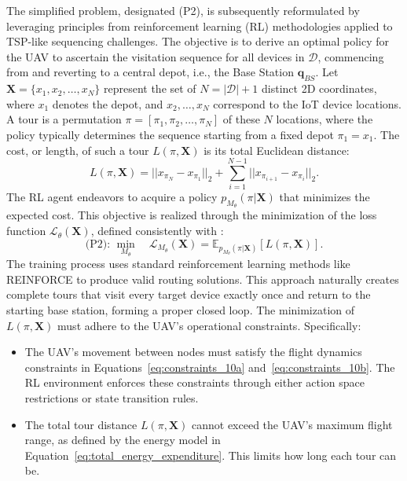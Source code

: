 \documentclass[10pt,conference,letterpaper]{IEEEtran}
\begin{document}
The simplified problem, designated (P2), is subsequently reformulated by leveraging principles from reinforcement learning (RL) methodologies applied to TSP-like sequencing challenges. The objective is to derive an optimal policy for the UAV to ascertain the visitation sequence for all devices in $\mathcal{D}$, commencing from and reverting to a central depot, i.e., the Base Station $\mathbf{q}_{BS}$.
Let $\mathbf{X} = \{x_1, x_2, \dots, x_N\}$ represent the set of $N=|\mathcal{D}|+1$ distinct 2D coordinates, where $x_1$ denotes the depot, and $x_2, \dots, x_N$ correspond to the IoT device locations. A tour is a permutation $\pi = [\pi_1, \pi_2, \dots, \pi_N]$ of these $N$ locations, where the policy typically determines the sequence starting from a fixed depot $\pi_1 = x_1$. The cost, or length, of such a tour $L(\pi, \mathbf{X})$ is its total Euclidean distance:
\begin{equation}
\label{eq:P2_rl_tsp_cost_revised}
L(\pi, \mathbf{X}) = ||x_{\pi_N} - x_{\pi_1}||_2 + \sum_{i=1}^{N-1} ||x_{\pi_{i+1}} - x_{\pi_i}||_2.
\end{equation}
The RL agent endeavors to acquire a policy $p_{M_{\theta}}(\pi|\mathbf{X})$ that minimizes the expected cost. This objective is realized through the minimization of the loss function $\mathcal{L}_{\theta}(\mathbf{X})$, defined consistently with \cite{DBLP:conf/aaai/ZhangZW022}:
\begin{equation}
\label{eq:P2_rl_loss_revised}
\text{(P2): } \min_{M_{\theta}} \quad \mathcal{L}_{M_{\theta}}(\mathbf{X}) = \mathbb{E}_{p_{M_{\theta}}(\pi|\mathbf{X})}[L(\pi, \mathbf{X})].
\end{equation}
The training process uses standard reinforcement learning methods like REINFORCE to produce valid routing solutions. This approach naturally creates complete tours that visit every target device exactly once and return to the starting base station, forming a proper closed loop. The minimization of $L(\pi, \mathbf{X})$ must adhere to the UAV's operational constraints. Specifically:
\begin{itemize}
    \item The UAV's movement between nodes must satisfy the flight dynamics constraints in Equations~\eqref{eq:constraints_10a} and~\eqref{eq:constraints_10b}. The RL environment enforces these constraints through either action space restrictions or state transition rules.
    \item The total tour distance $L(\pi, \mathbf{X})$ cannot exceed the UAV's maximum flight range, as defined by the energy model in Equation~\eqref{eq:total_energy_expenditure}. This limits how long each tour can be.
\end{itemize}
\end{document}

